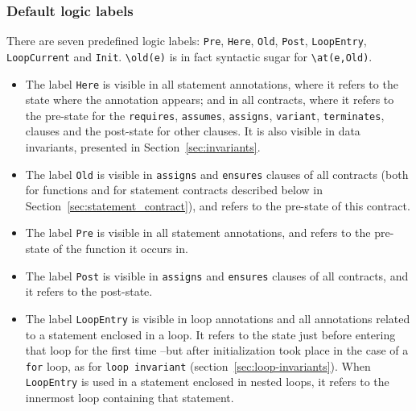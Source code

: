 \subsubsection*{Default logic labels}\label{sec:default-logic-labels}
There are seven predefined logic labels: \lstinline|Pre|, \lstinline|Here|,
\lstinline|Old|,
\lstinline|Post|, \lstinline|LoopEntry|, \lstinline|LoopCurrent|
and \lstinline|Init|.
\lstinline|\old(e)| is
in fact syntactic sugar for \lstinline|\at(e,Old)|.

\begin{itemize}

\item The label \lstinline|Here| is visible in all statement annotations,
  where it refers to the state where the annotation appears; and in
  all contracts, where it refers to the pre-state for the
  \lstinline|requires|, \lstinline|assumes|, \lstinline|assigns|,
  \lstinline|variant|,
  \lstinline|terminates|,
  clauses and the post-state for other clauses.
It is also visible in data invariants, presented in Section~\ref{sec:invariants}.
\item The label \lstinline|Old| is visible in \lstinline|assigns| and
  \lstinline|ensures| clauses of all contracts (both for functions and for
  statement contracts described below in
  Section~\ref{sec:statement_contract}), and refers to the pre-state
  of this contract.
\item The label \lstinline|Pre| is visible in all statement annotations,
  and refers to the pre-state of the function it occurs in.
\item The label \lstinline|Post| is visible in
\lstinline|assigns| and \lstinline|ensures| clauses of all contracts,
and it refers to the post-state.

\item The label \lstinline|LoopEntry|
is visible in loop annotations and
all annotations related to a statement enclosed in a loop.
It refers to the state just before entering that loop
for the first time --but after initialization took place in the case of a 
\lstinline|for| loop, as for \lstinline|loop invariant| 
(section~\ref{sec:loop-invariants}). When \lstinline|LoopEntry| is used in a 
statement enclosed in nested loops, it
refers to the innermost loop containing that statement.


\end{itemize}
